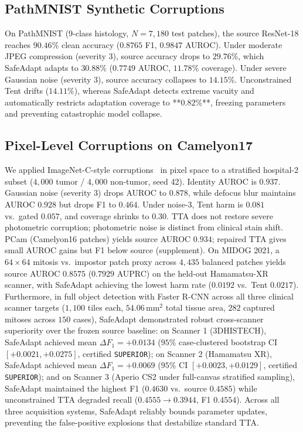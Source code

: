 \documentclass[conference]{IEEEtran}
\begin{document}
\subsection{PathMNIST Synthetic Corruptions}
On PathMNIST (9-class histology, $N=7{,}180$ test patches), the source ResNet-18 reaches $90.46\%$ clean accuracy ($0.8765$ F1, $0.9847$ AUROC). Under moderate JPEG compression (severity 3), source accuracy drops to $29.76\%$, which SafeAdapt adapts to $30.88\%$ ($0.7749$ AUROC, $11.78\%$ coverage).
Under severe Gaussian noise (severity 3), source accuracy collapses to $14.15\%$. Unconstrained Tent drifts ($14.11\%$), whereas SafeAdapt detects extreme vacuity and automatically restricts adaptation coverage to **$0.82\%$**, freezing parameters and preventing catastrophic model collapse.

\subsection{Pixel-Level Corruptions on Camelyon17}
We applied ImageNet-C-style corruptions~\cite{hendrycks2019benchmarking} in pixel space to a stratified hospital-2 subset ($4{,}000$ tumor / $4{,}000$ non-tumor, seed 42). Identity AUROC is $0.937$. Gaussian noise (severity 3) drops AUROC to $0.878$, while defocus blur maintains AUROC $0.928$ but drops F1 to $0.464$. Under noise-3, Tent harm is $0.081$ vs.\ gated $0.057$, and coverage shrinks to $0.30$. TTA does not restore severe photometric corruption; photometric noise is distinct from clinical stain shift.
PCam (Camelyon16 patches) yields source AUROC $0.934$; repaired TTA gives small AUROC gains but F1 below source (supplement). On MIDOG 2021, a $64{\times}64$ mitosis vs.\ impostor patch proxy across $4{,}435$ balanced patches yields source AUROC $0.8575$ ($0.7929$ AUPRC) on the held-out Hamamatsu-XR scanner, with SafeAdapt achieving the lowest harm rate ($0.0192$ vs.\ Tent $0.0217$). Furthermore, in full object detection with Faster R-CNN across all three clinical scanner targets ($1{,}100$ tiles each, $54.06\,\text{mm}^2$ total tissue area, $282$ captured mitoses across $150$ cases), SafeAdapt demonstrated robust cross-scanner superiority over the frozen source baseline:
on Scanner 1 (3DHISTECH), SafeAdapt achieved mean $\Delta F_1 = +0.0134$ ($95\%$ case-clustered bootstrap CI $[+0.0021, +0.0275]$, certified \texttt{SUPERIOR});
on Scanner 2 (Hamamatsu XR), SafeAdapt achieved mean $\Delta F_1 = +0.0069$ ($95\%$ CI $[+0.0023, +0.0129]$, certified \texttt{SUPERIOR});
and on Scanner 3 (Aperio CS2 under full-canvas stratified sampling), SafeAdapt maintained the highest F1 ($0.4630$ vs.\ source $0.4585$) while unconstrained TTA degraded recall ($0.4555 \to 0.3944$, F1 $0.4554$).
Across all three acquisition systems, SafeAdapt reliably bounds parameter updates, preventing the false-positive explosions that destabilize standard TTA.
\end{document}
